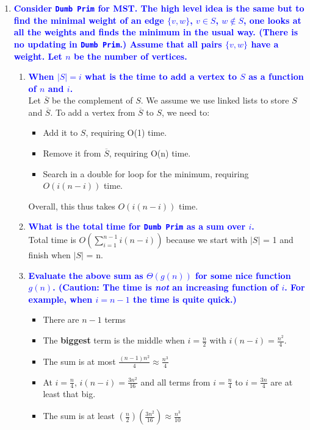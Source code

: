 \documentclass[11pt]{article}
\begin{document}
\begin{enumerate}
\item \textbf{\textcolor{blue}{Consider {\tt Dumb Prim} for MST.  The high level idea is the same but to find the minimal weight of an edge $\{v,w\}$, $v\in S$, $w\not\in S$, one looks at all the weights and finds the minimum in the usual way. (There is no updating in {\tt Dumb Prim}.) Assume that all pairs $\{v,w\}$ have a weight.  Let $n$ be the number of vertices.}}
\begin{enumerate}
    \item \textbf{\textcolor{blue}{When $|S|=i$ what is the time to add a vertex to $S$ as a function of $n$ and $i$.}}
        \\ Let $\overline{S}$ be the complement of $S$. We assume we use linked lists to store $S$ and $\overline{S}$. To add a vertex from $\overline{S}$ to $S$, we need to:
        \begin{itemize}
            \item Add it to $S$, requiring O(1) time.
            \item Remove it from $\overline{S}$, requiring O(n) time.
            \item Search in a double for loop for the minimum, requiring $O(i(n-i))$ time.
        \end{itemize}
        Overall, this thus takes $O(i(n-i))$ time.    
    \item \textbf{\textcolor{blue}{What is the total time for {\tt Dumb Prim} as a sum over $i$.}}
        \\ Total time is $O(\sum_{i=1}^{n-1} i(n-i))$ because we start with $|S|$ = 1 and finish when $|S|$ = n.
    \item \textbf{\textcolor{blue}{Evaluate the above sum as $\Theta(g(n))$ for some nice function $g(n)$. (Caution:  The time is {\em not} an increasing function of $i$.  For example, when $i=n-1$ the time is quite quick.)}}
        \begin{itemize}
            \item There are $n-1$ terms
            \item The \textbf{biggest} term is the middle when $i = \frac{n}{2}$ with $i(n-i) = \frac{n^2}{4}$.
            \item The sum is at most $\frac{(n-1)n^2}{4} \approx \frac{n^3}{4}$
            \item At $i=\frac{n}{4}$, $i(n-i) = \frac{3n^2}{16}$ and all terms from $i=\frac{n}{4}$ to $i=\frac{3n}{4}$ are at least that big.
            \item The sum is at least $(\frac{n}{2})(\frac{3n^2}{16}) \approx \frac{n^3}{10}$

\end{itemize}
\end{enumerate}
\end{enumerate}
\end{document}
